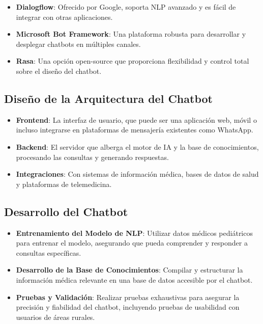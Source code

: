 \begin{itemize}
    \item \textbf{Dialogflow}: Ofrecido por Google, soporta NLP avanzado y es fácil de integrar con otras aplicaciones.
    \item \textbf{Microsoft Bot Framework}: Una plataforma robusta para desarrollar y desplegar chatbots en múltiples canales.
    \item \textbf{Rasa}: Una opción open-source que proporciona flexibilidad y control total sobre el diseño del chatbot.
\end{itemize}

\subsection{Diseño de la Arquitectura del Chatbot}

\begin{itemize}
    \item \textbf{Frontend}: La interfaz de usuario, que puede ser una aplicación web, móvil o incluso integrarse en plataformas de mensajería existentes como WhatsApp.
    \item \textbf{Backend}: El servidor que alberga el motor de IA y la base de conocimientos, procesando las consultas y generando respuestas.
    \item \textbf{Integraciones}: Con sistemas de información médica, bases de datos de salud y plataformas de telemedicina.
\end{itemize}

\subsection{Desarrollo del Chatbot}

\begin{itemize}
    \item \textbf{Entrenamiento del Modelo de NLP}: Utilizar datos médicos pediátricos para entrenar el modelo, asegurando que pueda comprender y responder a consultas específicas.
    \item \textbf{Desarrollo de la Base de Conocimientos}: Compilar y estructurar la información médica relevante en una base de datos accesible por el chatbot.
    \item \textbf{Pruebas y Validación}: Realizar pruebas exhaustivas para asegurar la precisión y fiabilidad del chatbot, incluyendo pruebas de usabilidad con usuarios de áreas rurales.
\end{itemize}

